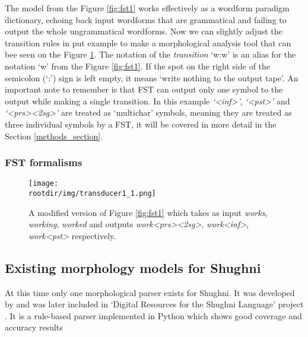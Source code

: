 The model from the Figure \ref{fig:fst1} works effectively as a wordform paradigm dictionary, echoing back input wordforms that are grammatical and failing to output the whole ungrammatical wordforms. Now we can slightly adjust the transition rules in put example to make a morphological analysis tool that can bee seen on the Figure \ref{fig:fst1_1}. The notation of the \textit{transition} `w:w' is an alias for the notation `w' from the Figure \ref{fig:fst1}. If the spot on the right side of the semicolon (`:') sign is left empty, it means `write nothing to the output tape'. An important note to remember is that FST can output only one symbol to the output while making a single transition. In this example \textit{`<inf>'}, \textit{`<pst>'} and \textit{`<prs><2sg>'} are treated as `multichar' symbols, meaning they are treated as three individual symbols by a FST, it will be covered in more detail in the Section \ref{methods_section}.

\subsubsection{FST formalisms}

\begin{figure}[!h]
    \centering
    \texttt{[image: \\rootdir/img/transducer1\_1.png]}
    \caption{A modified version of Figure \ref{fig:fst1} which takes as input \textit{works}, \textit{working}, \textit{worked} and outputs \textit{work<prs><2sg>}, \textit{work<inf>}, \textit{work<pst>} respectively.}
    \label{fig:fst1_1}
\end{figure}

\subsection{Existing morphology models for Shughni}
At this time only one morphological parser exists for Shughni. It was developed by \textcite{melenchenko_2021_parser} and was later included in `Digital Resources for the Shughni Language' project \parencite{makarov_digital_2022}. It is a rule-based parser implemented in Python which shows good coverage and accuracy results 